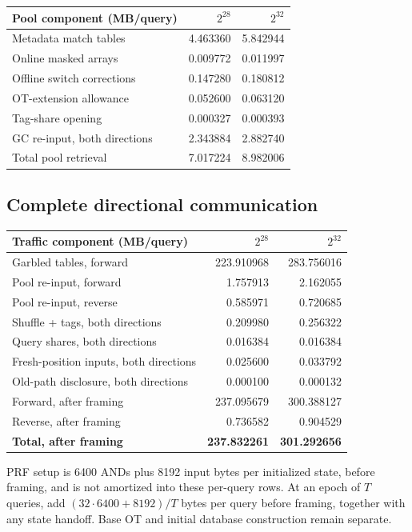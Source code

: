 \documentclass[11pt]{article}
\begin{document}
\begin{center}\small
\begin{tabular}{lrr}\toprule
Pool component (MB/query) & $2^{28}$ & $2^{32}$\\\midrule
Metadata match tables & 4.463360 & 5.842944\\
Online masked arrays & 0.009772 & 0.011997\\
Offline switch corrections & 0.147280 & 0.180812\\
OT-extension allowance & 0.052600 & 0.063120\\
Tag-share opening & 0.000327 & 0.000393\\
GC re-input, both directions & 2.343884 & 2.882740\\
Total pool retrieval & 7.017224 & 8.982006\\
\bottomrule\end{tabular}
\end{center}

\subsection{Complete directional communication}

\begin{center}\small
\begin{tabular}{lrr}\toprule
Traffic component (MB/query) & $2^{28}$ & $2^{32}$\\\midrule
Garbled tables, forward & 223.910968 & 283.756016\\
Pool re-input, forward & 1.757913 & 2.162055\\
Pool re-input, reverse & 0.585971 & 0.720685\\
Shuffle + tags, both directions & 0.209980 & 0.256322\\
Query shares, both directions & 0.016384 & 0.016384\\
Fresh-position inputs, both directions & 0.025600 & 0.033792\\
Old-path disclosure, both directions & 0.000100 & 0.000132\\
\midrule Forward, after framing & 237.095679 & 300.388127\\
Reverse, after framing & 0.736582 & 0.904529\\
\textbf{Total, after framing} & \textbf{237.832261} & \textbf{301.292656}\\
\bottomrule\end{tabular}
\end{center}

PRF setup is 6400 ANDs plus 8192 input bytes per
initialized state, before framing, and is not amortized into these per-query
rows. At an epoch of $T$ queries, add $(32\cdot6400+8192)/T$ bytes per query
before framing, together with any state handoff. Base OT and initial database
construction remain separate.
\end{document}
